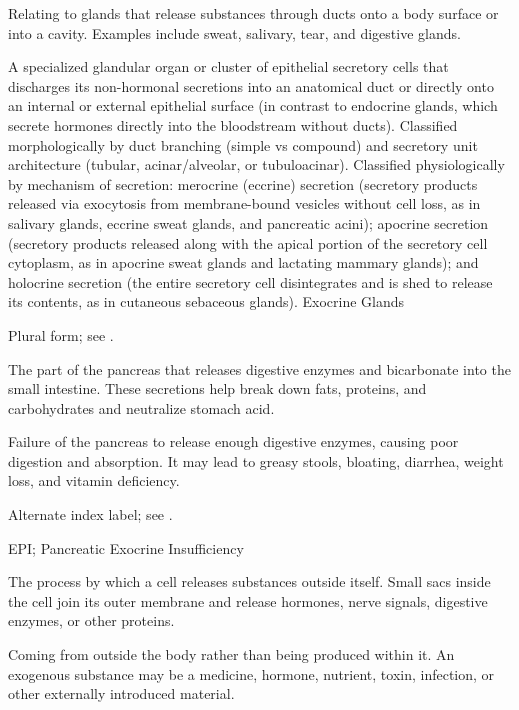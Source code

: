  Relating to glands that release substances through ducts onto a body surface or into a cavity. Examples include sweat, salivary, tear, and digestive glands.

 A specialized glandular organ or cluster of epithelial secretory cells that discharges its non-hormonal secretions into an anatomical duct or directly onto an internal or external epithelial surface (in contrast to endocrine glands, which secrete hormones directly into the bloodstream without ducts). Classified morphologically by duct branching (simple vs compound) and secretory unit architecture (tubular, acinar/alveolar, or tubuloacinar). Classified physiologically by mechanism of secretion: merocrine (eccrine) secretion (secretory products released via exocytosis from membrane-bound vesicles without cell loss, as in salivary glands, eccrine sweat glands, and pancreatic acini); apocrine secretion (secretory products released along with the apical portion of the secretory cell cytoplasm, as in apocrine sweat glands and lactating mammary glands); and holocrine secretion (the entire secretory cell disintegrates and is shed to release its contents, as in cutaneous sebaceous glands).
\synonyms
Exocrine Glands

 Plural form; see .

 The part of the pancreas that releases digestive enzymes and bicarbonate into the small intestine. These secretions help break down fats, proteins, and carbohydrates and neutralize stomach acid.

 Failure of the pancreas to release enough digestive enzymes, causing poor digestion and absorption. It may lead to greasy stools, bloating, diarrhea, weight loss, and vitamin deficiency.

 Alternate index label; see .

\synonyms
EPI; Pancreatic Exocrine Insufficiency

 The process by which a cell releases substances outside itself. Small sacs inside the cell join its outer membrane and release hormones, nerve signals, digestive enzymes, or other proteins.

 Coming from outside the body rather than being produced within it. An exogenous substance may be a medicine, hormone, nutrient, toxin, infection, or other externally introduced material.

